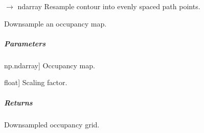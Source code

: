 \documentclass[letterpaper,10pt,english]{sphinxmanual}
\begin{document}
\begin{fulllineitems}

\begin{fulllineitems}
\label{\detokenize{mirte_lc_nav2.navigators:mirte_lc_nav2.navigators.SpanningTreePath.plan_path}}
\pysigstartsignatures
\pysiglinewithargsret
{}
{\sphinxparamcomma {}\sphinxparamcomma {}}
{{ $\rightarrow$ ndarray}}
\pysigstopsignatures
\sphinxAtStartPar
Resample contour into evenly spaced path points.

\end{fulllineitems}


\begin{fulllineitems}
\label{\detokenize{mirte_lc_nav2.navigators:mirte_lc_nav2.navigators.SpanningTreePath.read}}
\pysigstartsignatures
\pysiglinewithargsret
{}
{}
{}
\pysigstopsignatures
\end{fulllineitems}


\begin{fulllineitems}
\label{\detokenize{mirte_lc_nav2.navigators:mirte_lc_nav2.navigators.SpanningTreePath.sample_map}}
\pysigstartsignatures
\pysiglinewithargsret
{}
{}
{}
\pysigstopsignatures
\sphinxAtStartPar
Downsample an occupancy map.


\subparagraph{Parameters}
\label{\detokenize{mirte_lc_nav2.navigators:id22}}\begin{description}
\sphinxlineitem{map}{[}np.ndarray{]}
\sphinxAtStartPar
Occupancy map.

\sphinxlineitem{scale}{[}float{]}
\sphinxAtStartPar
Scaling factor.

\end{description}


\subparagraph{Returns}
\label{\detokenize{mirte_lc_nav2.navigators:id23}}\begin{description}
\sphinxAtStartPar
Downsampled occupancy grid.


\end{description}
\end{fulllineitems}
\end{fulllineitems}
\end{document}
